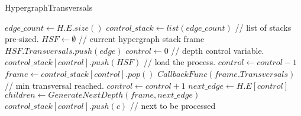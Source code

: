 \begin{algorithm}
	\caption{HypergraphTransversals}\label{HypergraphTransversals}
	\begin{algorithmic}[1]
		\State $edge\_count \gets H.E.size()$
		\State $control\_stack \gets list(edge\_count)$ // list of stacks pre-sized.
		\State $HSF \gets \emptyset $ // current hypergraph stack frame
		\State $HSF.Transversals.push(edge)$
		\State $control \gets 0$ // depth control variable.
		\State $control\_stack[control].push(HSF)$ // load the process.
		\State $control \gets control-1$
		\Else
		\State $frame \gets control\_stack[control].pop()$
		\State $CallbackFunc(frame.Transversals)$ // min transversal reached.
		\Else
		\State $control \gets control +1$
		\State $next\_edge \gets H.E[control]$
		\State $children \gets GenerateNextDepth(frame,next\_edge)$
		\State $control\_stack[control].push(c)$ // next to be processed
		\EndFor 
		\EndIf
		\EndIf
		\EndWhile
		\EndFunction
	\end{algorithmic}
\end{algorithm}